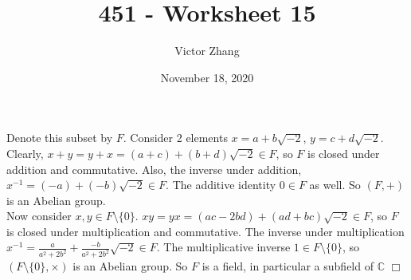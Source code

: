 \documentclass{article}
\title{451 - Worksheet 15}
\author{Victor Zhang}
\date{November 18, 2020}
\begin{document}
\maketitle

\section{}
Denote this subset by $F$. Consider 2 elements $x = a+b\sqrt{-2}$, $y = c+d\sqrt{-2}$. Clearly, $x + y = y + x = (a+c) + (b+d)\sqrt{-2} \in F$, so $F$ is closed under addition and commutative. Also, the inverse under addition, $x^{-1} = (-a) + (-b)\sqrt{-2} \in F$. The additive identity $0 \in F$ as well. So $(F,+)$ is an Abelian group.\\
Now consider $x,y \in F\setminus \{0\}$. $xy = yx = (ac-2bd) + (ad+bc)\sqrt{-2} \in F$, so $F$ is closed under multiplication and commutative. The inverse under multiplication $x^{-1} = \frac{a}{a^2+2b^2} + \frac{-b}{a^2+2b^2}\sqrt{-2} \in F$. The multiplicative inverse $1 \in F\setminus \{0\}$, so $(F\setminus\{0\}, \times)$ is an Abelian group. So $F$ is a field, in particular a subfield of $\mathbb{C}$ $\Box$
\end{document}
